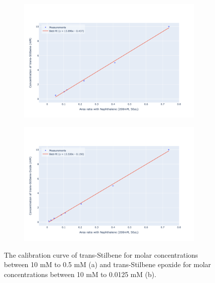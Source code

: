 \begin{figure}
    \centering
    \begin{subfigure}[b]{\textwidth}
        \centering
        \includegraphics[width=\textwidth]{chapter_6/figures/calibration_curve_ts.png}
        \caption{}
        \label{fig:calibration_curve_ts}
    \end{subfigure}
    \begin{subfigure}[b]{\textwidth}  
        \centering 
        \includegraphics[width=\textwidth]{chapter_6/figures/calibration_curve_tse.png}
        \caption{}
        \label{fig:calibration_curve_tse}
    \end{subfigure}

    \caption{\small The calibration curve of trans-Stilbene for molar concentrations between 10 mM to 0.5 mM (a) and trans-Stilbene epoxide for molar concentrations between 10 mM to 0.0125 mM (b).} 
    \label{fig:calibration_curve}
\end{figure}


